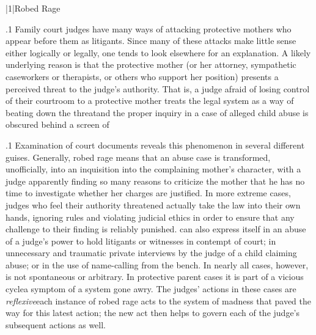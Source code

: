 \documentclass[11pt, twoside]{article}
\begin{document}
\thispagestyle{empty}

{\fontsize{13}{19}\selectfont


\hspace{-5em}\begin{minipage}{1.1\textwidth}
\begin{flushright}
{\fontsize{14}{22}\selectfont
\textbf{%
}
}
\end{flushright}
\end{minipage}


\vspace{6em}





\s|1|{Robed Rage}

\p.1{%
\noindent{}Family court judges have many ways of attacking protective mothers
who appear before them as litigants. Since many of these attacks make
little sense either logically or legally, one tends to look elsewhere for an
explanation. A likely underlying reason is that the protective mother
(or her attorney, sympathetic caseworkers or therapists, or others who
support her position) presents a perceived threat to the judge’s authority.
That is, a judge afraid of losing control of their courtroom to a protective
mother treats the legal system as a way of beating down the threat\mdash{}and
the proper inquiry in a case of alleged child abuse is obscured behind a
screen of 
}%

\p.1{%
Examination of court documents reveals this phenomenon in several
different guises. Generally, robed rage means that an abuse case is transformed, unofficially, into an inquisition into the complaining mother’s
character, with a judge apparently finding so many reasons to criticize
the mother that he has no time to investigate whether her charges are
justified. In more extreme cases, judges who feel their authority threatened actually take the law into their own hands, ignoring rules and
violating judicial ethics in order to ensure
that any challenge to their finding is reliably punished.
 can also express itself in an abuse
of a judge’s power to hold litigants or witnesses in contempt of court;
in unnecessary and traumatic private interviews by the judge of a child
claiming abuse; or in the use of name-calling from the bench. In nearly
all cases, however,  is not spontaneous or arbitrary.
In protective parent cases it is part of a vicious cycle\mdash{}a symptom of a system
gone awry. The judges’ actions in these cases are \textit{reflexive}\mdash{}each instance
of robed rage acts to  the system of madness that paved the
way for this latest action; the new act then helps to govern each of the
judge’s subsequent actions as well.
}%

}
\end{document}
